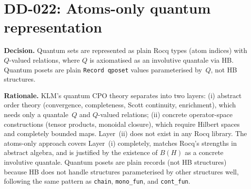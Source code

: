 \section*{DD-022: Atoms-only quantum representation}

\textbf{Decision.}
Quantum sets are represented as plain Rocq types (atom indices) with
$Q$-valued relations, where $Q$ is axiomatised as an involutive quantale
via HB.  Quantum posets are plain \texttt{Record qposet} values
parameterised by~$Q$, not HB structures.

\textbf{Rationale.}
KLM's quantum CPO theory separates into two layers: (i) abstract order
theory (convergence, completeness, Scott continuity, enrichment), which
needs only a quantale~$Q$ and $Q$-valued relations; (ii) concrete
operator-space constructions (tensor products, monoidal closure), which
require Hilbert spaces and completely bounded maps.  Layer~(ii) does not
exist in any Rocq library.  The atoms-only approach covers Layer~(i)
completely, matches Rocq's strengths in abstract algebra, and is
justified by the existence of $B(H)$ as a concrete involutive quantale.
Quantum posets are plain records (not HB structures) because HB does not
handle structures parameterised by other structures well, following the
same pattern as \texttt{chain}, \texttt{mono\_fun}, and
\texttt{cont\_fun}.
